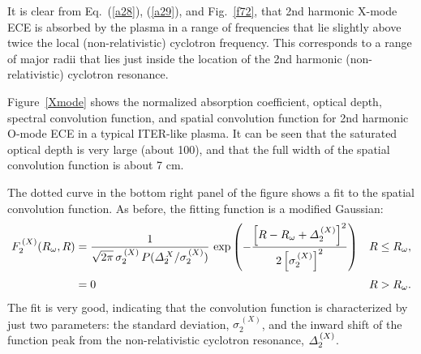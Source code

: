 \documentclass[12pt,prb,aps]{revtex4-1}
\begin{document}
 It is clear from Eq.~(\ref{a28}),
(\ref{a29}), and Fig.~\ref{f72}, that 2nd harmonic X-mode  ECE is absorbed by the plasma in a range of frequencies that lie slightly above twice the local (non-relativistic) cyclotron frequency. This corresponds to a range of major radii that lies just inside the location of the 2nd harmonic (non-relativistic) cyclotron resonance. 

Figure~\ref{Xmode} shows the normalized absorption coefficient, optical depth, spectral convolution function, and spatial convolution function for
2nd harmonic O-mode ECE in a typical ITER-like plasma. It can be seen that the saturated optical depth is very  large (about 100), and that the full 
width of the spatial convolution function is about 7 cm.

  The dotted curve in the bottom right panel of the figure shows a fit to the
spatial convolution function. As before, the fitting function is a modified Gaussian:
\begin{align}
F_2^{\,(X)}(R_\omega,R)&= \frac{1}{\sqrt{2\pi}\,\sigma_2^{\,(X)} \,P({\mit\Delta}_2^{\,X}/\sigma_2^{\,(X)})}\,
\exp\left(-\frac{\left[R-R_\omega+{\mit\Delta}_2^{\,(X)}\right]^2}{2\left[\sigma_2^{\,(X)}\right]^2}\right)&R\leq R_\omega,\\[0.5ex]
&= 0& R>R_\omega.
\end{align}
  The fit is very good, indicating that the convolution function 
is characterized by just two parameters: the standard deviation, $\sigma_2^{\,(X)}$, and the inward shift
of the function peak from the non-relativistic cyclotron resonance, ${\mit\Delta}_2^{\,(X)}$. 
\end{document}
